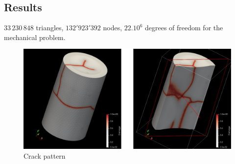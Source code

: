 \subsection{Results}

\(33\,230\,848\) triangles, \(132'923'392\) nodes,
\(22.10^6\) degrees of freedom for the mechanical problem.


\begin{figure}[H]
  \centering
  \includegraphics[width=10.cm]{../chapter_003_ef_micromorphic/figures/FuelPelletCracking-results.pdf}
  \caption{Crack pattern}
\end{figure}
